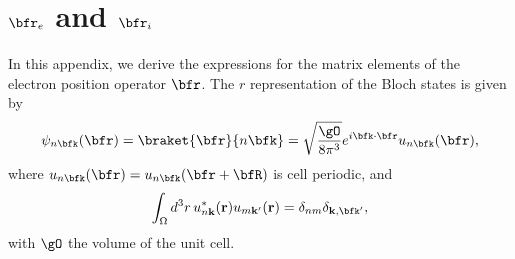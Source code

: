 \section{\texorpdfstring{$\bfr_e$ and $\bfr_i$}{Re and Ri}}
\label{reri}
In this appendix, we derive the expressions for the matrix elements of
the electron position operator $\bfr$. 
The $r$ representation of the
Bloch states is given by
\begin{align}\label{bloch}
\psi_{n\bfk}(\bfr)=\braket{\bfr}{n\bfk}=\sqrt{\frac{\gO}{8\pi^3}}
e^{i\bfk \cdot \bfr}u_{n\bfk}(\bfr)
,
\end{align}
where
$u_{n\bfk}(\bfr)=u_{n\bfk}(\bfr+\bfR)$ is cell periodic, and
\begin{align}\label{normal}
\int_{\Omega}d^{3}r\, u_{n\mathbf{k}}^{*}(\mathbf{r})u_{m\mathbf{k}'}(\mathbf{r})=\delta_{nm}\delta_{\mathbf{\mathbf{k},\bfk'}}
,
\end{align}
with $\gO$ the volume of the unit cell.

